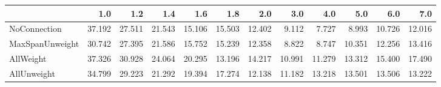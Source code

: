 \begin{tabular}{lrrrrrrrrrrr}
\toprule
{} &    1.0 &    1.2 &    1.4 &    1.6 &    1.8 &    2.0 &    3.0 &    4.0 &    5.0 &    6.0 &    7.0 \\
\midrule
NoConnection    & 37.192 & 27.511 & 21.543 & 15.106 & 15.503 & 12.402 &  9.112 &  7.727 &  8.993 & 10.726 & 12.016 \\
MaxSpanUnweight & 30.742 & 27.395 & 21.586 & 15.752 & 15.239 & 12.358 &  8.822 &  8.747 & 10.351 & 12.256 & 13.416 \\
AllWeight       & 37.326 & 30.928 & 24.064 & 20.295 & 13.196 & 14.217 & 10.991 & 11.279 & 13.312 & 15.400 & 17.490 \\
AllUnweight     & 34.799 & 29.223 & 21.292 & 19.394 & 17.274 & 12.138 & 11.182 & 13.218 & 13.501 & 13.506 & 13.222 \\
\bottomrule
\end{tabular}
